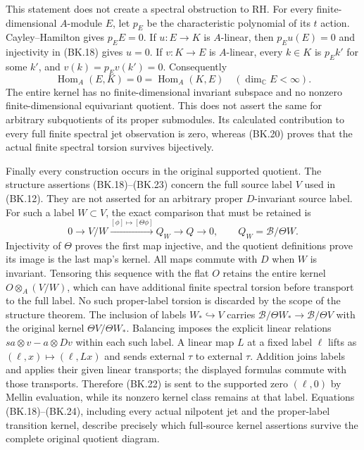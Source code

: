 This statement does not create a spectral obstruction to RH.
For every finite-dimensional $A$-module $E$, let $p_E$ be the
characteristic polynomial of its $t$ action.  Cayley--Hamilton
gives $p_EE=0$.  If $u:E\to K$ is $A$-linear, then
$p_Eu(E)=0$ and injectivity in (BK.18) gives $u=0$.
If $v:K\to E$ is $A$-linear, every $k\in K$ is $p_Ek'$ for
some $k'$, and $v(k)=p_Ev(k')=0$.  Consequently
\[
 \operatorname{Hom}_A(E,K)=0=
 \operatorname{Hom}_A(K,E)\quad(\dim_{\mathbb C}E<\infty).
                                                               \tag{BK.23}
\]
The entire kernel has no finite-dimensional invariant subspace
and no nonzero finite-dimensional equivariant quotient.  This does
not assert the same for arbitrary subquotients of its proper
submodules.  Its calculated contribution to every full finite
spectral jet observation is zero, whereas (BK.20) proves that
the actual finite spectral torsion survives bijectively.

Finally every construction occurs in the original supported quotient.
The structure assertions (BK.18)--(BK.23) concern the full source
label $V$ used in (BK.12).  They are not asserted for an arbitrary
proper $D$-invariant source label.  For such a label $W\subset V$,
the exact comparison that must be retained is
\[
 0\longrightarrow V/W\xrightarrow{[\phi]\mapsto[\Theta\phi]}
 Q_W\longrightarrow Q\longrightarrow0,
 \qquad Q_W=\mathscr B/\Theta W.                \tag{BK.24}
\]
Injectivity of $\Theta$ proves the first map injective, and the
quotient definitions prove its image is the last map's kernel.
All maps commute with $D$ when $W$ is invariant.  Tensoring this
sequence with the flat $O$ retains the entire kernel
$O\otimes_A(V/W)$, which can have additional finite spectral
torsion before transport to the full label.  No such proper-label
torsion is discarded by the scope of the structure theorem.
The inclusion of labels $W_*\hookrightarrow V$ carries
$\mathscr B/\Theta W_*\to\mathscr B/\Theta V$ with the original
kernel $\Theta V/\Theta W_*$.  Balancing imposes the explicit
linear relations $sa\otimes v-a\otimes Dv$ within each such
label.  A linear map $L$ at a fixed label $\ell$ lifts as
$(\ell,x)\mapsto(\ell,Lx)$ and sends external $\tau$ to
external $\tau$.  Addition joins labels and applies their given
linear transports; the displayed formulas commute with those
transports.  Therefore (BK.22) is sent to the supported zero
$(\ell,0)$ by Mellin evaluation, while its nonzero kernel class
remains at that label.  Equations (BK.18)--(BK.24), including every
actual nilpotent jet and the proper-label transition kernel,
describe precisely which full-source kernel assertions survive
the complete original quotient diagram.
